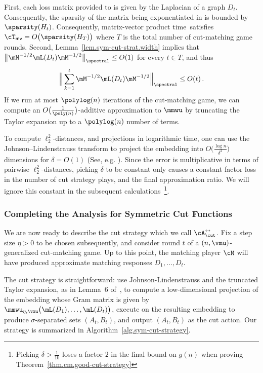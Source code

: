 \documentclass[letterpaper]{article}
\begin{document}
First, each loss matrix provided to \mmwu is given by the Laplacian of a graph $D_t$. Consequently, the sparsity of the matrix being exponentiated in \mmwu is bounded by $\sparsity(H_t)$. Consequently, matrix-vector product time~satisfies $\cT_{\textsf{mv}} = O\big( \sparsity(H_T) \big)$ where $T$ is the total number of cut-matching game rounds. Second, Lemma~\ref{lem.sym-cut-strat.width} implies that $\big\lVert \mM^{-1/2} \mL(D_t) \mM^{-1/2} \big\rVert_{\spectral} \leq O(1)$ for every $t \in T$, and thus
\begin{equation*}
\Big\lVert \sum_{k=1}^t \mM^{-1/2} \mL(D_t) \mM^{-1/2} \Big\rVert_{\spectral} \leq O(t) \, .
\end{equation*}
If we run at most $\polylog(n)$ iterations of the cut-matching game, we can compute an $O \big( \frac{1}{\poly(n)} \big)$-additive approximation to $\mmwu$ by truncating the Taylor expansion up to a $\polylog(n)$ number of terms.

To compute $\ell_2^2$-distances, and projections in logarithmic time, one can use the Johnson--Lindenstrauss transform \cite{JohnsonLindenstraussOriginal} to project the embedding into $O\big( \frac{\log n}{\delta^2} \big)$ dimensions for $\delta = O(1)$ (See, e.g. \cite{dasgupta2003elementary,achlioptas2001database,blum2020foundations}). Since the error is multiplicative in terms of pairwise $\ell_2^2$-distances, picking $\delta$ to be constant only causes a constant factor loss in the number of cut strategy plays, and the final approximation ratio. We will ignore this constant in the subsequent calculations~\footnote{Picking $\delta > \frac{1}{10}$ loses a factor $2$ in the final bound on $g(n)$ when proving Theorem~\ref{thm.cm.good-cut-strategy}}.


\subsubsection{Completing the Analysis for Symmetric Cut Functions}

We are now ready to describe the cut strategy which we call $\cA^{\leftrightarrow}_{\cut}$. Fix a step size $\eta > 0$ to be chosen subsequently, and consider round $t$ of a $(n,\vmu)$-generalized cut-matching game. Up to this point, the matching player $\cM$ will have produced approximate matching responses $D_1, \ldots, D_t$.

The cut strategy is straightforward: use Johnson-Lindenstrauss and the truncated Taylor expansion, as in Lemma~6 of~\cite{arora2007combinatorial}, to compute a low-dimensional projection of the embedding whose Gram matrix is given by $\mmwu_{\eta, \vmu}\big( \mL(D_1), \ldots, \mL(D_t) \big)$, execute \roundcut on the resulting embedding to produce $\sigma$-separated sets $(A_t, B_t)$, and output $(A_t, B_t)$ as the cut action. Our strategy is summarized in Algorithm~\ref{alg.sym-cut-strategy}.
\end{document}

